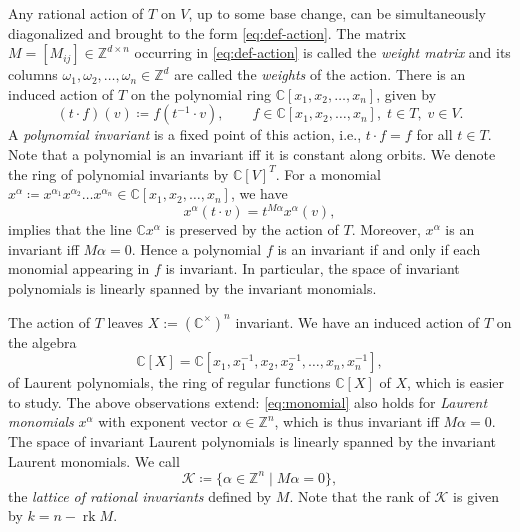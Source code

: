 \documentclass[10pt,a4paper]{article}
\theoremstyle{definition}
\DeclareMathOperator{\rk}{rk}
\DeclareMathOperator{\supp}{supp}
\newcommand{\CC}{\mathbb{C}}
\newcommand{\ZZ}{\mathbb{Z}}
\numberwithin{equation}{section}
\begin{document}
Any rational action of $T$ on $V$, up to some base change,
can be simultaneously diagonalized and brought to the form \cref{eq:def-action}.
The matrix $M=[M_{ij}]\in\ZZ^{d\times n}$ occurring in \cref{eq:def-action}
is called the \textit{weight matrix} and its columns
$\omega_1,\omega_2,\dots,\omega_n\in\ZZ^d$ are called
the \textit{weights} of the action.
There is an induced action of $T$ on the polynomial ring $\CC[x_1,x_2,\dots,x_n]$, given by
\[
 (t\cdot f)(v) \coloneqq f(t^{-1}\cdot v), \qquad f\in\CC[x_1,x_2,\dots,x_n],\; t\in T,\; v\in V.
\]
A \textit{polynomial invariant} is a fixed point of this action, i.e.,
$t\cdot f=f$ for all $t\in T$.
Note that a polynomial is an invariant iff it is constant along orbits.
We denote the ring of polynomial invariants by $\CC[V]^T$.
For a monomial $x^\alpha\coloneqq x^{\alpha_1}x^{\alpha_2}\dots x^{\alpha_n}\in\CC[x_1,x_2,\dots,x_n]$,
we have \begin{equation}
\label{eq:monomial}
x^\alpha(t\cdot v) = t^{M\alpha} x^\alpha(v),
\end{equation}
 implies that the line $\CC x^\alpha$ is preserved by the action of $T$.
Moreover, $x^\alpha$ is an invariant iff $M\alpha=0$.
Hence a polynomial $f$ is an invariant if and only if each monomial appearing in $f$ is invariant.
In particular, the space of invariant polynomials is linearly spanned by the invariant monomials.

The action of $T$ leaves $X := (\CC^\times)^n$ invariant.
We have an induced action of $T$ on the algebra
\[
 \CC[X] = \CC[x_1,x_1^{-1},x_2,x_2^{-1},\dots,x_n,x_n^{-1}],
\]
of Laurent polynomials,
the ring of regular functions $\CC[X]$ of $X$,
which is easier to study.
The above observations extend:
\cref{eq:monomial} also holds for \textit{Laurent monomials}
$x^{\alpha}$ with exponent vector $\alpha\in\ZZ^n$,
which is thus invariant iff $M\alpha=0$.
The space of invariant Laurent polynomials is linearly spanned by the invariant Laurent monomials.
We call
\begin{equation}
\label{eq:def-L}
    \mathcal{K} \coloneqq \{\alpha\in\ZZ^n\mid M\alpha=0\} ,
\end{equation}
the \emph{lattice of rational invariants} defined by $M$.
Note that the rank of $\mathcal{K}$ is given by $k= n - \rk M$.
\end{document}
